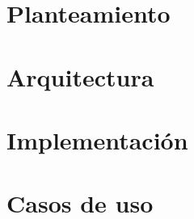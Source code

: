 \section{Planteamiento}


\section{Arquitectura}


\section{Implementación}


\section{Casos de uso}



        
